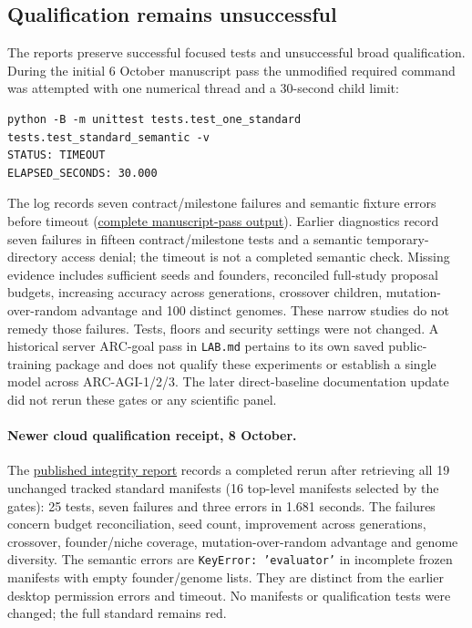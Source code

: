 \documentclass[11pt]{article}
\begin{document}
\subsection{Qualification remains unsuccessful}
The reports preserve successful focused tests and unsuccessful broad qualification. During the
initial 6 October manuscript pass the unmodified required command was attempted with one numerical
thread and a 30-second child limit:
\begin{verbatim}
python -B -m unittest tests.test_one_standard tests.test_standard_semantic -v
STATUS: TIMEOUT
ELAPSED_SECONDS: 30.000
\end{verbatim}
The log records seven contract/milestone failures and semantic fixture errors before timeout
(\href{https://github.com/Sanokei/CellForge/blob/02beaf18251fca5ed1f1eb55e92f00a3e3820e88/paper/standard-gates-20261006.log}{complete manuscript-pass output}). Earlier diagnostics
record seven failures in fifteen contract/milestone tests and a semantic temporary-directory
access denial; the timeout is not a completed semantic check. Missing evidence includes sufficient
seeds and founders, reconciled full-study proposal budgets, increasing accuracy across generations,
crossover children, mutation-over-random advantage and 100 distinct genomes. These narrow studies
do not remedy those failures. Tests, floors and security settings were not changed. A historical
server ARC-goal pass in \texttt{LAB.md} pertains to its own saved public-training package and
does not qualify these experiments or establish a single model across ARC-AGI-1/2/3.
The later direct-baseline documentation update did not rerun these gates or any scientific panel.

\paragraph{Newer cloud qualification receipt, 8 October.}
The \href{https://github.com/Sanokei/CellForge/blob/bfc928bf0c1f77922b4de00834412f986cd54bfa/reports/CONTROL_ERROR_INTEGRITY_20261008.md}{published integrity report}
records a completed rerun after retrieving all 19 unchanged tracked standard manifests
(16 top-level manifests selected by the gates): 25 tests, seven failures and three errors
in 1.681 seconds. The failures concern budget reconciliation, seed count, improvement
across generations, crossover, founder/niche coverage, mutation-over-random advantage
and genome diversity. The semantic errors are \texttt{KeyError: 'evaluator'} in incomplete
frozen manifests with empty founder/genome lists. They are distinct from the earlier
desktop permission errors and timeout. No manifests or qualification tests were changed;
the full standard remains red.
\end{document}
